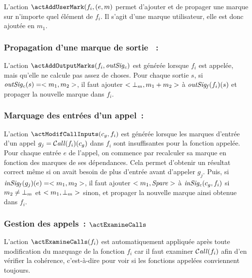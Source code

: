L'action $\actAddUserMark(f_i, (e, m)$  permet d'ajouter et de propager
une marque sur
n'importe quel élément de $f_i$. Il s'agit d'une marque utilisateur,
elle est donc ajoutée en $m_1$.

\subsubsection{Propagation d'une marque de sortie ~: \actAddOutputMarks}

L'action $\actAddOutputMarks(f_i, \outsigc)$
est générée lorsque $f_i$ est appelée, mais qu'elle ne calcule pas assez de
choses. Pour chaque sortie $s$, si $\mathit{outSig_c}(s) = <m_1, m_2>$,
il faut ajouter $<{\bot}_m, m_1+m_2>$ à $\mathit{outSig_f}(f_i)(s)$ et propager
la nouvelle marque dans $f_i$.

\subsubsection{Marquage des entrées d'un appel~: \actModifCallInputs}

L'action $\actModifCallInputs(c_g, f_i)$ est générée lorsque
les marques d'entrée d'un appel $g_j = \operatorname{\mathcal{C\mathit{all}}}(f_i)(c_g)$ dans $f_i$
sont insuffisantes pour la fonction appelée. Pour chaque entrée $e$ de l'appel, 
on commence par recalculer sa marque en fonction des marques de ses dépendances.
Cela permet d'obtenir un résultat correct même si on avait besoin de plus
d'entrée avant d'appeler $g_j$. Puis, si
$\mathit{inSig_f}(g_j)(e) = <m_1, m_2>$, il faut ajouter $<m_1, \mathit{Spare}>$ à
$\mathit{inSig_c}(c_g, f_i)$ si $m_2 \neq {\bot}_m$ et $<m_1, {\bot}_m>$ sinon,
et propager la nouvelle marque ainsi obtenue dans $f_i$.


\subsubsection{Gestion des appels~: $\actExamineCalls$}

L'action $\actExamineCalls(f_i)$ est automatiquement appliquée
après toute modification du marquage de la fonction $f_i$
car il faut examiner $\operatorname{\mathcal{C\mathit{all}}}(f_i)$ afin d'en vérifier la cohérence,
c'est-à-dire pour voir si les fonctions appelées conviennent toujours.
\bb


